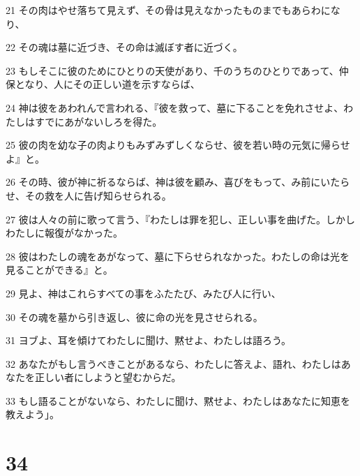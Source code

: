 \par 21 その肉はやせ落ちて見えず、その骨は見えなかったものまでもあらわになり、
\par 22 その魂は墓に近づき、その命は滅ぼす者に近づく。
\par 23 もしそこに彼のためにひとりの天使があり、千のうちのひとりであって、仲保となり、人にその正しい道を示すならば、
\par 24 神は彼をあわれんで言われる、『彼を救って、墓に下ることを免れさせよ、わたしはすでにあがないしろを得た。
\par 25 彼の肉を幼な子の肉よりもみずみずしくならせ、彼を若い時の元気に帰らせよ』と。
\par 26 その時、彼が神に祈るならば、神は彼を顧み、喜びをもって、み前にいたらせ、その救を人に告げ知らせられる。
\par 27 彼は人々の前に歌って言う、『わたしは罪を犯し、正しい事を曲げた。しかしわたしに報復がなかった。
\par 28 彼はわたしの魂をあがなって、墓に下らせられなかった。わたしの命は光を見ることができる』と。
\par 29 見よ、神はこれらすべての事をふたたび、みたび人に行い、
\par 30 その魂を墓から引き返し、彼に命の光を見させられる。
\par 31 ヨブよ、耳を傾けてわたしに聞け、黙せよ、わたしは語ろう。
\par 32 あなたがもし言うべきことがあるなら、わたしに答えよ、語れ、わたしはあなたを正しい者にしようと望むからだ。
\par 33 もし語ることがないなら、わたしに聞け、黙せよ、わたしはあなたに知恵を教えよう」。

\chapter{34}

